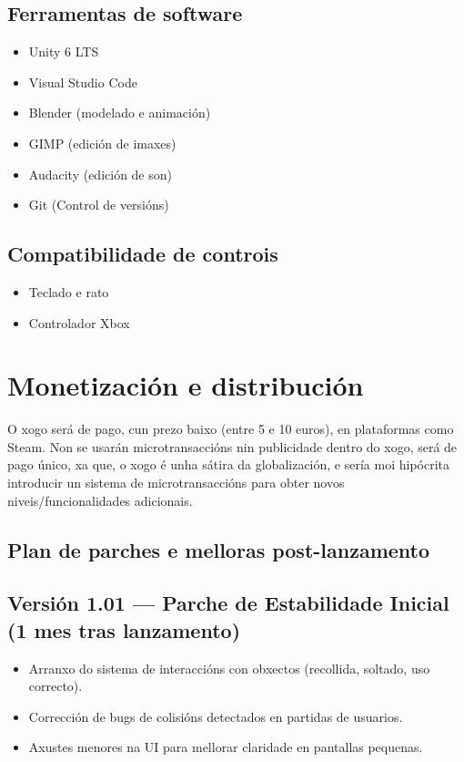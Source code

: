 \documentclass{report}  %
\begin{document}
\subsection{Ferramentas de software}
\begin{itemize}
    \item Unity 6 LTS
    \item Visual Studio Code
    \item Blender (modelado e animación)
    \item GIMP (edición de imaxes)
    \item Audacity (edición de son)
    \item Git (Control de versións)
\end{itemize}
\subsection{Compatibilidade de controis}
\begin{itemize}
    \item Teclado e rato
    \item Controlador Xbox
\end{itemize}

\section{Monetización e distribución}
O xogo será de pago, cun prezo baixo (entre 5 e 10 euros), en plataformas como Steam. Non se usarán microtransaccións nin publicidade dentro do xogo, será de pago único, xa que, o xogo é unha sátira da globalización, e sería moi hipócrita introducir un sistema de microtransaccións para obter novos niveis/funcionalidades adicionais.
\subsection{Plan de parches e melloras post-lanzamento}

\subsection*{Versión 1.01 — Parche de Estabilidade Inicial (1 mes tras lanzamento)}
\begin{itemize}
    \item Arranxo do sistema de interaccións con obxectos (recollida, soltado, uso correcto).
    \item Corrección de bugs de colisións detectados en partidas de usuarios.
    \item Axustes menores na UI para mellorar claridade en pantallas pequenas.
\end{itemize}
\end{document}

